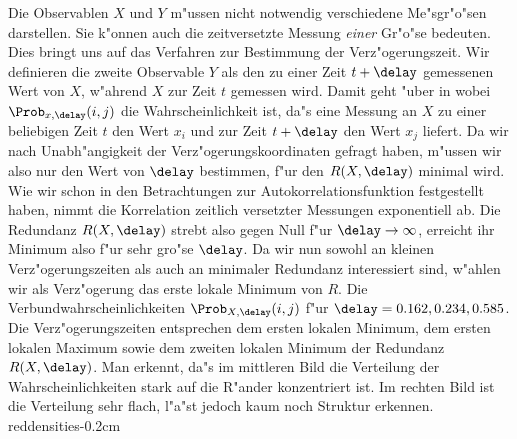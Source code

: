 Die Observablen $X$ und $Y$ m"ussen nicht notwendig verschiedene Me"sgr"o"sen darstellen.
Sie k"onnen auch die zeitversetzte Messung \emph{einer} Gr"o"se bedeuten.  Dies bringt uns
auf das Verfahren zur Bestimmung der Verz"ogerungszeit.  Wir definieren die zweite
Observable $Y$ als den zu einer Zeit $t+\delay$ gemessenen Wert von $X$, w"ahrend $X$ zur
Zeit $t$ gemessen wird. Damit geht  "uber in
 wobei $\Prob_{x,\delay}(i,j)$ die Wahrscheinlichkeit ist, da"s
eine Messung an $X$ zu einer beliebigen Zeit $t$ den Wert $x_i$ und zur Zeit $t+\delay$
den Wert $x_j$ liefert.  Da wir nach
Unabh"angigkeit der Verz"ogerungskoordinaten gefragt haben, m"ussen wir also nur den Wert
von $\delay$ bestimmen, f"ur den $R(X,\delay)$ minimal wird. Wie wir schon in den
Betrachtungen zur Autokorrelationsfunktion festgestellt haben, nimmt die Korrelation
zeitlich versetzter Messungen exponentiell ab. Die Redundanz $R(X,\delay)$ strebt also
gegen Null f"ur $\delay\to\infty$, erreicht ihr Minimum also f"ur sehr gro"se $\delay$. Da
wir nun sowohl an kleinen Verz"ogerungszeiten als auch an minimaler Redundanz interessiert
sind, w"ahlen wir als Verz"ogerung das erste lokale Minimum von $R$.
 {Die
  Verbundwahrscheinlichkeiten $\Prob_{X,\delay}(i,j)$ f"ur $\delay=0.162,0.234,0.585$. Die
  Verz"ogerungszeiten entsprechen dem ersten lokalen Minimum, dem ersten lokalen Maximum
  sowie dem zweiten lokalen Minimum der Redundanz $R(X,\delay)$. Man erkennt, da"s im
  mittleren Bild die Verteilung der Wahrscheinlichkeiten stark auf die R"ander
  konzentriert ist. Im rechten Bild ist die Verteilung sehr flach, l"a"st jedoch kaum noch
  Struktur erkennen.  }{reddensities}{-0.2cm}

